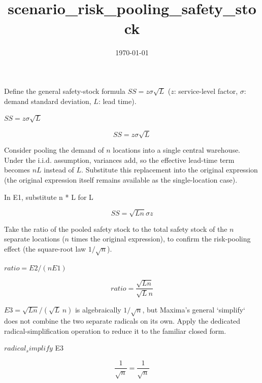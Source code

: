 \documentclass[dvipdfmx]{article}
\title{scenario\_risk\_pooling\_safety\_stock}
\date{\today}
\begin{document}
\maketitle

Define the general safety-stock formula $SS=z\sigma\sqrt{L}$ ($z$: service-level factor, $\sigma$: demand standard deviation, $L$: lead time).

$SS = z \sigma \sqrt{L}$

\begin{equation}
  SS = z \sigma \sqrt{L}
  \label{eq:E1}
\end{equation}

Consider pooling the demand of $n$ locations into a single central warehouse. Under the i.i.d. assumption, variances add, so the effective lead-time term becomes $nL$ instead of $L$. Substitute this replacement into the original expression (the original expression itself remains available as the single-location case).

In E1, substitute n * L for L

\begin{equation}
  SS = \sqrt{L n} \sigma z
  \label{eq:E2}
\end{equation}

Take the ratio of the pooled safety stock to the total safety stock of the $n$ separate locations ($n$ times the original expression), to confirm the risk-pooling effect (the square-root law $1/\sqrt n$).

$ratio = E2 / (n E1)$

\begin{equation}
  ratio = \frac{\sqrt{L n}}{\sqrt{L} n}
  \label{eq:E3}
\end{equation}

$E3=\sqrt{Ln}/(\sqrt{L}\,n)$ is algebraically $1/\sqrt{n}$, but Maxima's general `simplify` does not combine the two separate radicals on its own. Apply the dedicated radical-simplification operation to reduce it to the familiar closed form.

$radical_simplify$ E3

\begin{equation}
  \frac{1}{\sqrt{n}}=\frac{1}{\sqrt{n}}
  \label{eq:E4}
\end{equation}
\end{document}
